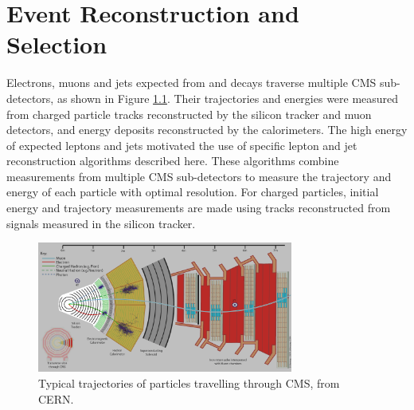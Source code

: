 \chapter{Event Reconstruction and Selection}
\label{sec:reco_chapter}

Electrons, muons and jets expected from \WR and \nul decays traverse multiple CMS sub-detectors, as shown in 
Figure \ref{fig:particleTrajectories}.  Their trajectories and energies were measured from charged particle tracks 
reconstructed by the silicon tracker and muon detectors, and energy deposits reconstructed by the calorimeters.  The 
high energy of expected leptons and jets motivated the use of specific lepton and jet reconstruction algorithms 
described here.  These algorithms combine measurements from multiple CMS sub-detectors to measure the trajectory 
and energy of each particle with optimal resolution.  For charged particles, initial energy and trajectory 
measurements are made using tracks reconstructed from signals measured in the silicon tracker.

\begin{figure}[h]
	\centering
	\includegraphics[width=0.75\textwidth]{figures/flowOfParticlesThroughCMS.png}
	\caption{Typical trajectories of particles travelling through CMS, from CERN.}
	\label{fig:particleTrajectories}
\end{figure}


